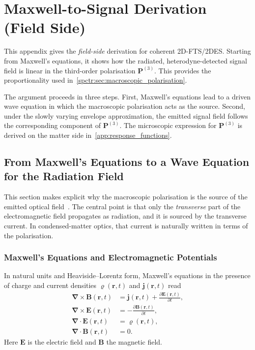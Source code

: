 \chapter{Maxwell-to-Signal Derivation (Field Side)}
\label{app:2dfts_maxwell}

This appendix gives the \emph{field-side} derivation for coherent 2D-FTS/2DES. Starting from Maxwell's equations, it shows how the radiated, heterodyne-detected signal field is linear in the third-order polarisation $\boldsymbol{P}^{(3)}$. This provides the proportionality used in~\autoref{spctr:sec:macroscopic_polarisation}.

The argument proceeds in three steps. First, Maxwell's equations lead to a driven wave equation in which the macroscopic polarisation acts as the source. Second, under the slowly varying envelope approximation, the emitted signal field follows the corresponding component of $\boldsymbol{P}^{(3)}$. 
The microscopic expression for $\boldsymbol{P}^{(3)}$ is derived on the matter side in~\autoref{app:response_functions}.

\section{From Maxwell's Equations to a Wave Equation for the Radiation Field}
\label{app:sec:maxwell_to_wave}

This section makes explicit why the macroscopic polarisation is the source of the emitted optical field~\cite{mancal2022nonlinearopticalspectroscopy}. The central point is that only the \emph{transverse} part of the electromagnetic field propagates as radiation, and it is sourced by the transverse current. In condensed-matter optics, that current is naturally written in terms of the polarisation.

\subsection{Maxwell's Equations and Electromagnetic Potentials}
\label{app:subsec:maxwell_eqs}
In natural units and Heaviside--Lorentz form, Maxwell's equations in the presence of charge and current densities $\varrho(\boldsymbol{r},t)$ and $\boldsymbol{j}(\boldsymbol{r},t)$ read \cite{guidry1991gaugefieldtheories}
\begin{align}
	\boldsymbol{\nabla} \times \boldsymbol{B}(\boldsymbol{r},t)
	 & = \boldsymbol{j}(\boldsymbol{r},t) + \frac{\partial \boldsymbol{E}(\boldsymbol{r},t)}{\partial t},
	\label{eq:app_maxwell_ampere}
	\\
	\boldsymbol{\nabla} \times \boldsymbol{E}(\boldsymbol{r},t)
	 & = -\frac{\partial \boldsymbol{B}(\boldsymbol{r},t)}{\partial t},
	\label{eq:app_maxwell_faraday}
	\\
	\boldsymbol{\nabla}\cdot \boldsymbol{E}(\boldsymbol{r},t)
	 & = \varrho(\boldsymbol{r},t),
	\label{eq:app_maxwell_gaussE}
	\\
	\boldsymbol{\nabla}\cdot \boldsymbol{B}(\boldsymbol{r},t)
	 & = 0.
	\label{eq:app_maxwell_gaussB}
\end{align}
Here $\boldsymbol{E}$ is the electric field and $\boldsymbol{B}$ the magnetic field.

